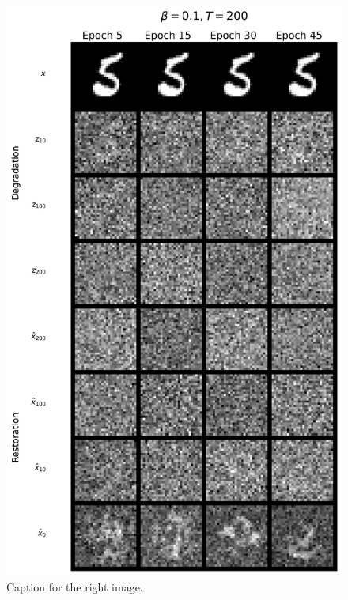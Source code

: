 \documentclass[11pt]{article}
\begin{document}
\begin{figure}[H]
\begin{minipage}{0.48\textwidth}
        \includegraphics[width=\linewidth]{figs/q1b_bad_cond_samples.png}
        \caption{Caption for the right image.}
        \label{fig:right_img}
    \end{minipage}
\end{figure}
\end{document}
